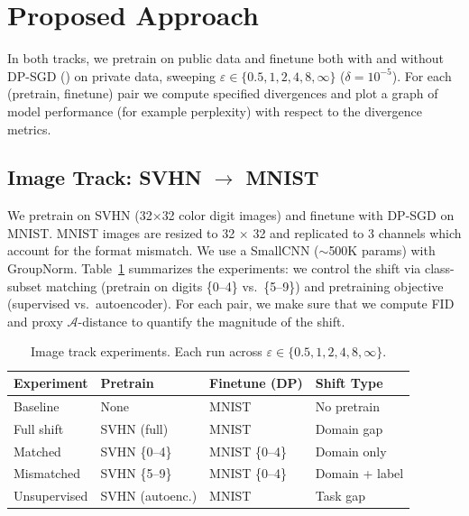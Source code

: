 \documentclass{article}
\begin{document}
\section{Proposed Approach}

In both tracks, we pretrain on public data and finetune both with and without DP-SGD (\cite{abadi2016deep}) on private data, sweeping $\varepsilon \in \{0.5, 1, 2, 4, 8, \infty\}$ ($\delta=10^{-5}$). For each (pretrain, finetune) pair we compute specified divergences and plot a graph of model performance (for example perplexity) with respect to the divergence metrics.

\subsection{Image Track: SVHN $\rightarrow$ MNIST}


We pretrain on SVHN \cite{netzer2011svhn} (32$\times$32 color digit images) and finetune with DP-SGD on MNIST. MNIST images are resized to 32 $\times$ 32 and replicated to 3 channels which account for the format mismatch. We use a SmallCNN (${\sim}$500K params) with GroupNorm. Table~\ref{tab:image-experiments} summarizes the experiments: we control the shift via class-subset matching (pretrain on digits \{0--4\} vs.\ \{5--9\}) and pretraining objective (supervised vs.\ autoencoder). For each pair, we make sure that we compute FID and proxy $\mathcal{A}$-distance \cite{bendavid2010theory} to quantify the magnitude of the shift.

\begin{table}[h]
\centering
\small
\begin{tabular}{@{}llll@{}}
\toprule
\textbf{Experiment} & \textbf{Pretrain} & \textbf{Finetune (DP)} & \textbf{Shift Type} \\
\midrule
Baseline    & None           & MNIST         & No pretrain \\
Full shift  & SVHN (full)    & MNIST         & Domain gap \\
Matched     & SVHN \{0--4\}  & MNIST \{0--4\} & Domain only \\
Mismatched  & SVHN \{5--9\}  & MNIST \{0--4\} & Domain + label \\
Unsupervised & SVHN (autoenc.) & MNIST        & Task gap \\
\bottomrule
\end{tabular}
\caption{Image track experiments. Each run across $\varepsilon \in \{0.5, 1, 2, 4, 8, \infty\}$.}
\label{tab:image-experiments}
\end{table}
\end{document}
